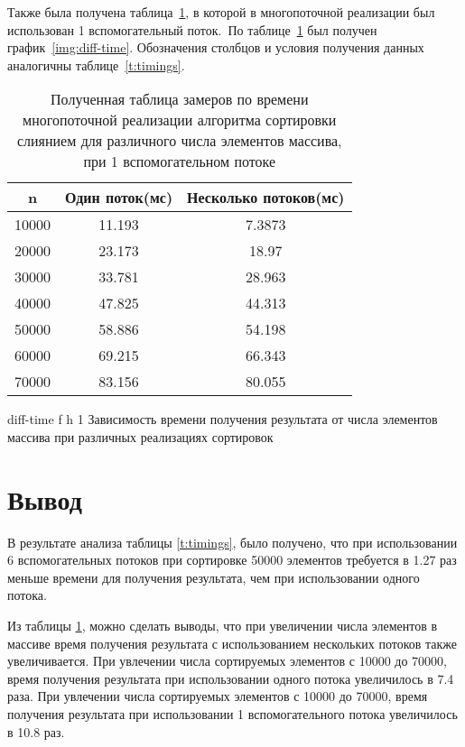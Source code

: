 Также была получена таблица~\ref{t:timings-n}, в которой в многопоточной реализации был использован 1 вспомогательный поток.~По таблице~\ref{t:timings-n} был получен график~\ref{img:diff-time}. 
Обозначения столбцов и условия получения данных аналогичны таблице~\ref{t:timings}.

\begin{table}[H]
	\centering
	\caption{Полученная таблица замеров по времени многопоточной реализации алгоритма сортировки слиянием для различного числа элементов массива, при 1 вспомогательном потоке}
	\begin{tabular}{|c|c|c|}
		\hline
		n       & Один поток(мс) & Несколько потоков(мс) \\ \hline
		10000 & 11.193                  & 7.3873                            \\ \hline
		20000 & 23.173                  & 18.97                             \\ \hline
		30000 & 33.781                  & 28.963                            \\ \hline
		40000 & 47.825                  & 44.313                            \\ \hline
		50000 & 58.886                  & 54.198                            \\ \hline
		60000 & 69.215                  & 66.343                            \\ \hline
		70000 & 83.156                  & 80.055                            \\ \hline
	\end{tabular}
	\label{t:timings-n}
\end{table}




{diff-time} %
{f} %
{h} %
{1\textwidth} %
{Зависимость времени получения результата от числа элементов массива при различных реализациях сортировок} %


\section*{Вывод}
В результате анализа таблицы \ref{t:timings}, было получено, что при использовании 6 вспомогательных потоков при сортировке 50000 элементов требуется в 1.27 раз меньше времени для получения результата, чем при использовании одного потока. 

Из таблицы \ref{t:timings-n}, можно сделать выводы, что при увеличении числа элементов в массиве
время получения результата с использованием нескольких потоков также увеличивается. При увлечении числа сортируемых элементов с 10000 до 70000, время получения результата при использовании одного потока  увеличилось в 7.4 раза.
При увлечении числа сортируемых элементов с 10000 до 70000, время получения результата при использовании 1 вспомогательного потока увеличилось в 10.8 раз.


